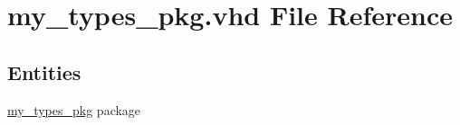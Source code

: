 \hypertarget{my__types__pkg_8vhd}{}\section{my\+\_\+types\+\_\+pkg.\+vhd File Reference}
\label{my__types__pkg_8vhd}
\subsection*{Entities}
\begin{DoxyCompactItemize}
\item 
\hyperlink{classmy__types__pkg}{my\+\_\+types\+\_\+pkg} package
\end{DoxyCompactItemize}
